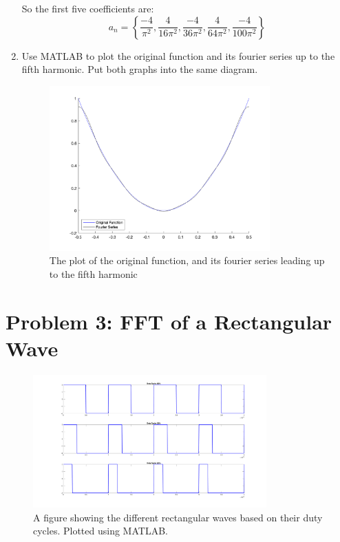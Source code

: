 \begin{enumerate}
          So the first five coefficients are:
          \begin{equation}
              a_n = \left\{ \frac{-4}{\pi^2}, \frac{4}{16\pi^2}, \frac{-4}{36\pi^2}, \frac{4}{64\pi^2}, \frac{-4}{100\pi^2} \right\}
          \end{equation}
    \item Use MATLAB to plot the original function and its fourier series up to the fifth harmonic. Put both graphs into the same diagram.
          \begin{figure}[H]
              \centering
              \includegraphics[width=0.8\textwidth]{images/prelab_problem_2_plot.png}
              \caption{The plot of the original function, and its fourier series leading up to the fifth harmonic}
          \end{figure}
\end{enumerate}

\newpage
\section{Problem 3: FFT of a Rectangular Wave}

\begin{figure}[H]
    \centering
    \includegraphics[width=0.8\textwidth]{images/prelab_problem_3_time.png}
    \caption{A figure showing the different rectangular waves based on their duty cycles. Plotted using MATLAB.}
\end{figure}

